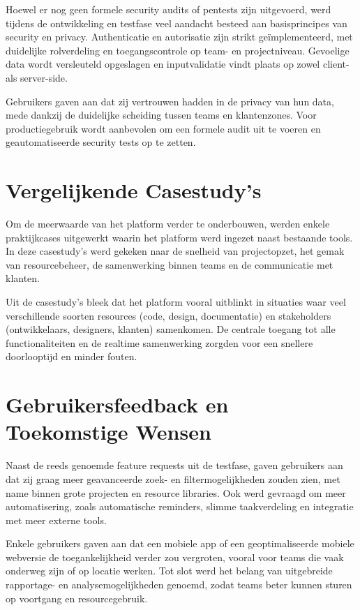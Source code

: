 Hoewel er nog geen formele security audits of pentests zijn uitgevoerd, werd tijdens de ontwikkeling en testfase veel aandacht besteed aan basisprincipes van security en privacy. Authenticatie en autorisatie zijn strikt geïmplementeerd, met duidelijke rolverdeling en toegangscontrole op team- en projectniveau. Gevoelige data wordt versleuteld opgeslagen en inputvalidatie vindt plaats op zowel client- als server-side.

Gebruikers gaven aan dat zij vertrouwen hadden in de privacy van hun data, mede dankzij de duidelijke scheiding tussen teams en klantenzones. Voor productiegebruik wordt aanbevolen om een formele audit uit te voeren en geautomatiseerde security tests op te zetten.

\section{Vergelijkende Casestudy's}
\label{sec:casestudy}

Om de meerwaarde van het platform verder te onderbouwen, werden enkele praktijkcases uitgewerkt waarin het platform werd ingezet naast bestaande tools. In deze casestudy's werd gekeken naar de snelheid van projectopzet, het gemak van resourcebeheer, de samenwerking binnen teams en de communicatie met klanten.

Uit de casestudy's bleek dat het platform vooral uitblinkt in situaties waar veel verschillende soorten resources (code, design, documentatie) en stakeholders (ontwikkelaars, designers, klanten) samenkomen. De centrale toegang tot alle functionaliteiten en de realtime samenwerking zorgden voor een snellere doorlooptijd en minder fouten.

\section{Gebruikersfeedback en Toekomstige Wensen}
\label{sec:feedback-wensen}

Naast de reeds genoemde feature requests uit de testfase, gaven gebruikers aan dat zij graag meer geavanceerde zoek- en filtermogelijkheden zouden zien, met name binnen grote projecten en resource libraries. Ook werd gevraagd om meer automatisering, zoals automatische reminders, slimme taakverdeling en integratie met meer externe tools.

Enkele gebruikers gaven aan dat een mobiele app of een geoptimaliseerde mobiele webversie de toegankelijkheid verder zou vergroten, vooral voor teams die vaak onderweg zijn of op locatie werken. Tot slot werd het belang van uitgebreide rapportage- en analysemogelijkheden genoemd, zodat teams beter kunnen sturen op voortgang en resourcegebruik.


